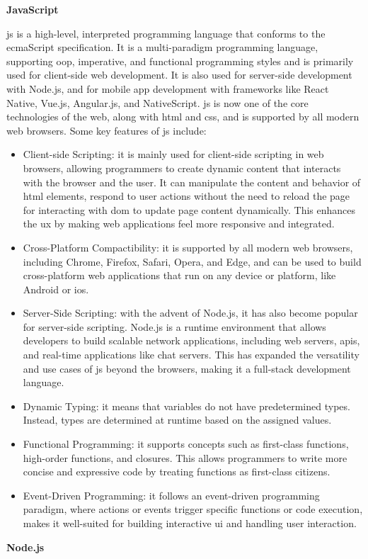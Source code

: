 \begin{multicols}{2}
      \textbf{JavaScript}

      \acrshort{js} is a high-level, interpreted programming language that conforms to the \acrshort{ecma}Script specification.
      It is a multi-paradigm programming language, supporting \acrshort{oop}, imperative, and functional programming styles and
      is primarily used for client-side web development. It is also used for server-side development with Node.js, and for
      mobile app development with frameworks like React Native, Vue.js, Angular.js, and NativeScript. \acrshort{js} is now one
      of the core technologies of the web, along with \acrshort{html} and \acrshort{css}, and is supported by all modern web
      browsers. Some key features of \acrshort{js} include:
      \begin{itemize}
            \item Client-side Scripting: it is mainly used for client-side scripting in web browsers, allowing programmers to
                  create dynamic content that interacts with the browser and the user. It can manipulate the content and behavior
                  of \acrshort{html} elements, respond to user actions without the need to reload the page for interacting with
                  \acrshort{dom} to update page content dynamically. This enhances the \acrshort{ux} by making web applications
                  feel more responsive and integrated.
            \item Cross-Platform Compactibility: it is supported by all modern web browsers, including Chrome, Firefox, Safari,
                  Opera, and Edge, and can be used to build cross-platform web applications that run on any device or platform,
                  like Android or i\acrshort{os}.
            \item Server-Side Scripting: with the advent of Node.js, it has also become popular for server-side scripting. Node.js
                  is a runtime environment that allows developers to build scalable network applications, including web servers,
                  \acrshort{api}s, and real-time applications like chat servers. This has expanded the versatility and use cases of
                  \acrshort{js} beyond the browsers, making it a full-stack development language.
            \item Dynamic Typing: it means that variables do not have predetermined types. Instead, types are determined at runtime
                  based on the assigned values.
            \item Functional Programming: it supports concepts such as first-class functions, high-order functions, and closures.
                  This allows programmers to write more concise and expressive code by treating functions as first-class citizens.
            \item Event-Driven Programming: it follows an event-driven programming paradigm, where actions or events trigger specific
                  functions or code execution, makes it well-suited for building interactive \acrshort{ui} and handling user interaction.
      \end{itemize}
      \textbf{Node.js}


\end{multicols}
